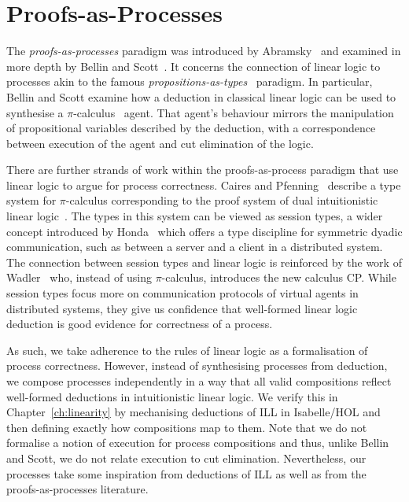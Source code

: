 \documentclass[class=smolathesis,crop=false]{standalone}
\begin{document}
\section{Proofs-as-Processes}
\label{sec:intro/pap}

The \emph{proofs-as-processes} paradigm was introduced by Abramsky~\cite{abramsky-1994} and examined in more depth by Bellin and Scott~\cite{bellin_scott-1994}.
It concerns the connection of linear logic to processes akin to the famous \emph{propositions-as-types}~\cite{wadler-2015} paradigm.
In particular, Bellin and Scott examine how a deduction in classical linear logic can be used to synthesise a $\pi$-calculus~\cite{milner-1993} agent.
That agent's behaviour mirrors the manipulation of propositional variables described by the deduction, with a correspondence between execution of the agent and cut elimination of the logic.

There are further strands of work within the proofs-as-process paradigm that use linear logic to argue for process correctness.
Caires and Pfenning~\cite{caires_pfenning-2010} describe a type system for $\pi$-calculus corresponding to the proof system of dual intuitionistic linear logic~\cite{barber-1996}.
The types in this system can be viewed as session types, a wider concept introduced by Honda~\cite{honda-1993} which offers a type discipline for symmetric dyadic communication, such as between a server and a client in a distributed system.
The connection between session types and linear logic is reinforced by the work of Wadler~\cite{wadler-2012} who, instead of using $\pi$-calculus, introduces the new calculus CP\@.
While session types focus more on communication protocols of virtual agents in distributed systems, they give us confidence that well-formed linear logic deduction is good evidence for correctness of a process.

As such, we take adherence to the rules of linear logic as a formalisation of process correctness.
However, instead of synthesising processes from deduction, we compose processes independently in a way that all valid compositions reflect well-formed deductions in intuitionistic linear logic.
We verify this in Chapter~\ref{ch:linearity} by mechanising deductions of ILL in Isabelle/HOL and then defining exactly how compositions map to them.
Note that we do not formalise a notion of execution for process compositions and thus, unlike Bellin and Scott, we do not relate execution to cut elimination.
Nevertheless, our processes take some inspiration from deductions of ILL as well as from the proofs-as-processes literature.
\end{document}
